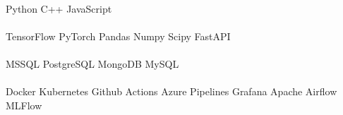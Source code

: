 \begin{minipage}[t]{.6\textwidth}
    \\
    Python \textbullet{}   C++ \textbullet{} JavaScript
    \\
    \\
    TensorFlow \textbullet{} PyTorch \textbullet{} Pandas \textbullet{} Numpy \textbullet{} Scipy \textbullet{} FastAPI
    \\
     \\
    MSSQL \textbullet{} PostgreSQL \textbullet{} MongoDB \textbullet{} MySQL
    \\
    \\
    Docker \textbullet{} Kubernetes \textbullet{} Github Actions \textbullet{} Azure Pipelines \textbullet{} Grafana \textbullet{} Apache Airflow \textbullet{} MLFlow
    \sectionsep
    \end{minipage}